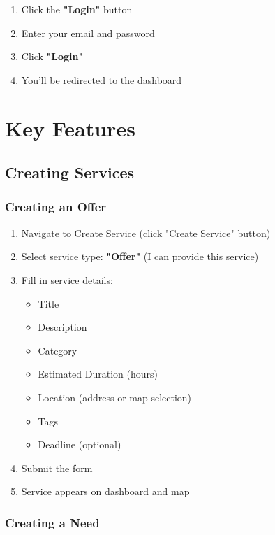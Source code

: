 \documentclass[12pt,a4paper]{report}
\begin{document}
\begin{enumerate}
    \item Click the \textbf{"Login"} button
    \item Enter your email and password
    \item Click \textbf{"Login"}
    \item You'll be redirected to the dashboard
\end{enumerate}

\section{Key Features}

\subsection{Creating Services}

\subsubsection{Creating an Offer}

\begin{enumerate}
    \item Navigate to Create Service (click "Create Service" button)
    \item Select service type: \textbf{"Offer"} (I can provide this service)
    \item Fill in service details:
          \begin{itemize}
              \item Title
              \item Description
              \item Category
              \item Estimated Duration (hours)
              \item Location (address or map selection)
              \item Tags
              \item Deadline (optional)
          \end{itemize}
    \item Submit the form
    \item Service appears on dashboard and map
\end{enumerate}

\subsubsection{Creating a Need}
\end{document}
